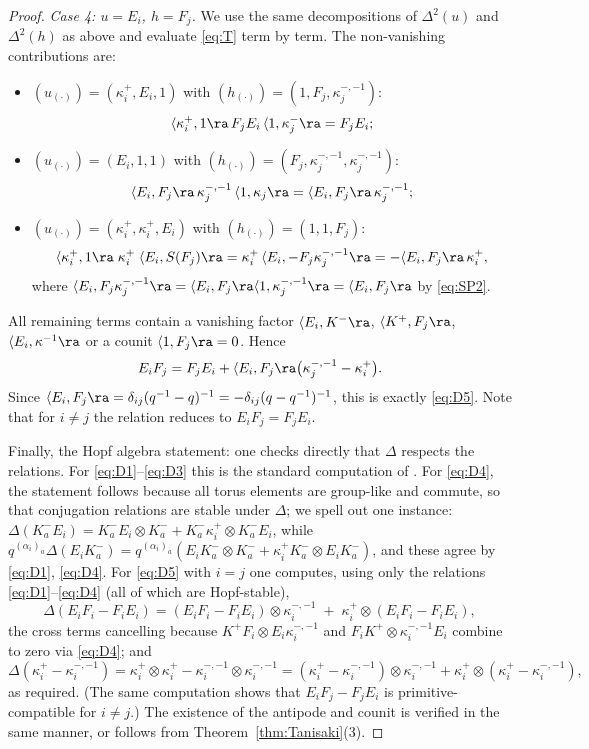 \documentclass[11pt]{amsart}
\newcommand{\la}{\langle}
\newcommand{\KP}{K^{+}}
\newcommand{\KM}{K^{-}}
\newcommand{\al}{\alpha}
\theoremstyle{plain}
\theoremstyle{definition}
\numberwithin{equation}{section}
\begin{document}
\begin{proof}
\smallskip
\noindent\emph{Case 4: $u=E_i$, $h=F_j$.}  We use the same decompositions of
$\Delta^2(u)$ and $\Delta^2(h)$ as above and evaluate \eqref{eq:T} term by
term.  The non-vanishing contributions are:
\begin{itemize}
\item $(u_{(\cdot)})=(\kappa_i^{+},E_i,1)$ with
$(h_{(\cdot)})=(1,F_j,\kappa_j^{-,-1})$:
\[
\la\kappa_i^{+},1\ra\,F_jE_i\,\la1,\kappa_j^{-}\ra=F_jE_i ;
\]
\item $(u_{(\cdot)})=(E_i,1,1)$ with
$(h_{(\cdot)})=(F_j,\kappa_j^{-,-1},\kappa_j^{-,-1})$:
\[
\la E_i,F_j\ra\,\kappa_j^{-,-1}\,\la 1,\kappa_j\ra
=\la E_i,F_j\ra\,\kappa_j^{-,-1} ;
\]
\item $(u_{(\cdot)})=(\kappa_i^{+},\kappa_i^{+},E_i)$ with
$(h_{(\cdot)})=(1,1,F_j)$:
\[
\la\kappa_i^{+},1\ra\;\kappa_i^{+}\;\la E_i,S(F_j)\ra
=\kappa_i^{+}\,\la E_i,-F_j\kappa_j^{-,-1}\ra
=-\la E_i,F_j\ra\,\kappa_i^{+} ,
\]
where $\la E_i,F_j\kappa_j^{-,-1}\ra=\la E_i,F_j\ra\la1,\kappa_j^{-,-1}\ra
=\la E_i,F_j\ra$ by \eqref{eq:SP2}.
\end{itemize}
All remaining terms contain a vanishing factor
$\la E_i,\KM\ra$, $\la\KP,F_j\ra$, $\la E_i,\kappa^{-1}\ra$ or a counit
$\la1,F_j\ra=0$.  Hence
\[
E_iF_j=F_jE_i+\la E_i,F_j\ra\big(\kappa_j^{-,-1}-\kappa_i^{+}\big).
\]
Since $\la E_i,F_j\ra=\delta_{ij}(q^{-1}-q)^{-1}
=-\delta_{ij}(q-q^{-1})^{-1}$, this is exactly \eqref{eq:D5}.  Note that for
$i\ne j$ the relation reduces to $E_iF_j=F_jE_i$.

\smallskip
Finally, the Hopf algebra statement: one checks directly that
$\Delta$ respects the relations.  For \eqref{eq:D1}--\eqref{eq:D3} this is
the standard computation of \cite[Ch.~6]{KS}.  For \eqref{eq:D4}, the
statement follows because all torus elements are group-like and commute, so
that conjugation relations are stable under $\Delta$; we spell out
one instance: $\Delta(\KM_aE_i)=\KM_aE_i\otimes\KM_a+\KM_a\kappa_i^{+}
\otimes\KM_aE_i$, while
$q^{(\al_i)_a}\Delta(E_i\KM_a)=q^{(\al_i)_a}(E_i\KM_a\otimes\KM_a
+\kappa_i^{+}\KM_a\otimes E_i\KM_a)$, and these agree by \eqref{eq:D1},
\eqref{eq:D4}.  For \eqref{eq:D5} with $i=j$ one computes, using only the
relations \eqref{eq:D1}--\eqref{eq:D4} (all of which are Hopf-stable),
\[
\Delta(E_iF_i-F_iE_i)
=(E_iF_i-F_iE_i)\otimes\kappa_i^{-,-1}\;+\;\kappa_i^{+}\otimes
(E_iF_i-F_iE_i),
\]
the cross terms cancelling because
$\KP F_i\otimes E_i\kappa_i^{-,-1}$ and
$F_i\KP\otimes\kappa_i^{-,-1}E_i$ combine to zero via \eqref{eq:D4}; and
\[
\Delta(\kappa_i^{+}-\kappa_i^{-,-1})
=\kappa_i^{+}\otimes\kappa_i^{+}-\kappa_i^{-,-1}\otimes\kappa_i^{-,-1}
=(\kappa_i^{+}-\kappa_i^{-,-1})\otimes\kappa_i^{-,-1}
+\kappa_i^{+}\otimes(\kappa_i^{+}-\kappa_i^{-,-1}),
\]
as required.  (The same computation shows that
$E_iF_j-F_jE_i$ is primitive-compatible for $i\ne j$.)  The existence of the
antipode and counit is verified in the same manner, or follows from
Theorem~\ref{thm:Tanisaki}(3).
\end{proof}
\end{document}

